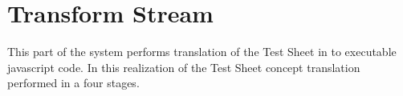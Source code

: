 %
%


\section{Transform Stream}
\label{sec:transform}
This part of the system performs translation of the Test Sheet in to executable javascript code. In this realization of the Test Sheet concept translation performed in a four stages. 


